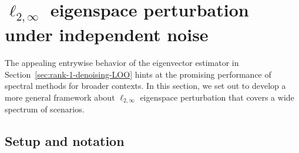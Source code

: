 
\section{$\ell_{2,\infty}$ eigenspace perturbation under independent noise}
\label{sec:setup-general-theory-independent}



The appealing entrywise behavior of the eigenvector estimator in Section~\ref{sec:rank-1-denoising-LOO} hints at the promising performance of spectral methods for broader contexts. In this section, we set out to develop a more general framework about $\ell_{2,\infty}$ eigenspace perturbation  that covers a wide spectrum of scenarios.



\subsection{Setup and notation}\label{sec:setup-general-theory}


